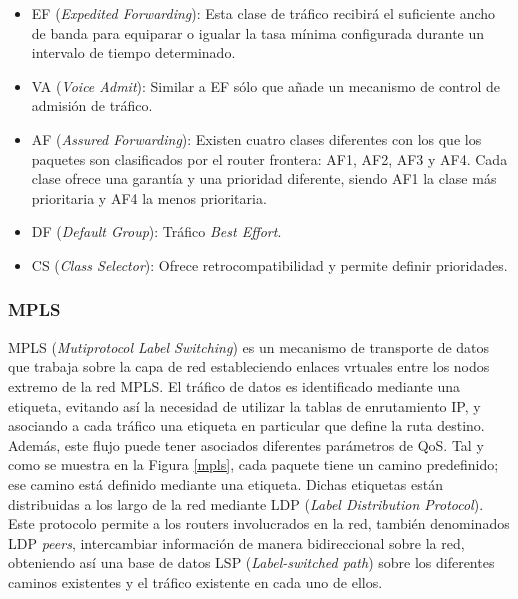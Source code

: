 \begin{itemize}
	\begin{itemize}
	    \item EF (\textit{Expedited Forwarding}): Esta clase de tráfico recibirá el suficiente ancho de banda para equiparar o igualar la tasa mínima configurada durante un intervalo de tiempo determinado.
	    \item VA (\textit{Voice Admit}): Similar a EF sólo que añade un mecanismo de control de admisión de tráfico.
	    \item AF (\textit{Assured Forwarding}): Existen cuatro clases diferentes con los que los paquetes son clasificados por el router frontera: AF1, AF2, AF3 y AF4. Cada clase ofrece una garantía y una prioridad diferente, siendo AF1 la clase más prioritaria y AF4 la menos prioritaria.
	    \item DF (\textit{Default Group}): Tráfico \textit{Best Effort}.
	    \item CS (\textit{Class Selector}): Ofrece retrocompatibilidad y permite definir prioridades.
	\end{itemize}
	\end{itemize}
	
	\subsubsection{MPLS}
		 MPLS (\textit{Mutiprotocol Label Switching}) es un mecanismo de transporte de datos que trabaja sobre la capa de red estableciendo enlaces vrtuales entre los nodos extremo de la red MPLS. El tráfico de datos es identificado mediante una etiqueta, evitando así la necesidad de utilizar la tablas de enrutamiento IP, y asociando a cada tráfico una etiqueta en particular que define la ruta destino. Además, este flujo puede tener asociados diferentes parámetros de QoS. Tal y como se muestra en la Figura \ref{mpls}, cada paquete tiene un camino predefinido; ese camino está definido mediante una etiqueta. Dichas etiquetas están distribuidas a los largo de la red mediante LDP (\textit{Label Distribution Protocol}). Este protocolo permite a los routers involucrados en la red, también denominados LDP \textit{peers}, intercambiar información de manera bidireccional sobre la red,  obteniendo así una base de datos LSP (\textit{Label-switched path}) sobre los diferentes caminos existentes y el tráfico existente en cada uno de ellos.
		 
